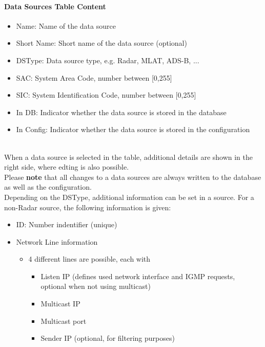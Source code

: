\paragraph {Data Sources Table Content}
\label{sec:configure_datasources_table_content}

\begin{itemize}
\item Name: Name of the data source
\item Short Name: Short name of the data source (optional)
\item DSType: Data source type, e.g. Radar, MLAT, ADS-B, ...
\item SAC: System Area Code, number between [0,255]
\item SIC: System Identification Code, number between [0,255]
\item In DB: Indicator whether the data source is stored in the database
\item In Config: Indicator whether the data source is stored in the configuration
\end{itemize}
\ \\

When a data source is selected in the table, additional details are shown in the right side, where edting is also possible. \\

Please \textbf{note} that all changes to a data sources are always written to the database as well as the configuration. \\

Depending on the DSType, additional information can be set in a source. For a non-Radar source, the following information is given:

\begin{itemize}
\item ID: Number indentifier (unique)
\item Network Line information
\begin{itemize}
    \item 4 different lines are possible, each with 
    \begin{itemize}
      \item Listen IP (defines used network interface and IGMP requests, optional when not using multicast)
      \item Multicast IP
      \item Multicast port
      \item Sender IP (optional, for filtering purposes)
    \end{itemize}
\end{itemize}
\end{itemize}
\ \\

